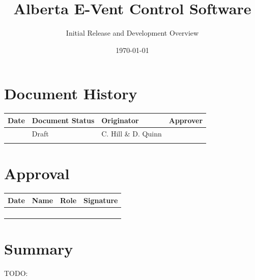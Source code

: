 \documentclass[]{article}
\title{Alberta E-Vent Control Software}
\author{Initial Release and Development Overview}
\begin{document}
	


\maketitle

\newpage

\section*{Document History}
\begin{center}
	\begin{tabular}{ |p{3cm}| p{3cm}| p{3cm}| p{3cm}|}
		\hline
		Date & Document Status & Originator & Approver \\
		\hline 
		 \date{\today} & Draft & C. Hill \& D. Quinn &  \\  
		\hline
		 &   &  & \\ 
		 \hline
	\end{tabular}
\end{center}

\section*{Approval}

\begin{center}
	\begin{tabular}{ |p{3cm}| p{3cm}| p{3cm}| p{3cm}|}
		\hline
		Date & Name & Role & Signature \\
		\hline 
		& &  &  \\  [2ex]
		\hline
		&   &  & \\ [2ex]
		\hline 
		&   &  & \\ [2ex]
		\hline   
		&   &  & \\ [2ex]
		\hline     
	\end{tabular}
\end{center}


\clearpage

\tableofcontents

\clearpage


\section{Summary}

TODO:

\end{document}
